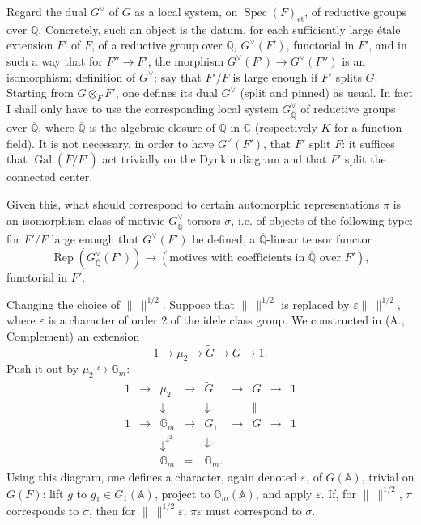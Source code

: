 \documentclass[11pt]{article}
\newcommand{\Gal}{\operatorname{Gal}}
\newcommand{\Spec}{\operatorname{Spec}}
\newcommand{\Rep}{\operatorname{Rep}}
\newcommand{\Fbar}{\overline F}
\newcommand{\normchar}{\|\ \|}
\begin{document}
Regard the dual \(G^\vee\) of \(G\) as a local system, on \(\Spec(F)_{\mathrm{et}}\), of reductive groups over \(\mathbb Q\). Concretely, such an object is the datum, for each sufficiently large étale extension \(F'\) of \(F\), of a reductive group over \(\mathbb Q\), \(G^\vee(F')\), functorial in \(F'\), and in such a way that for \(F''\to F'\), the morphism \(G^\vee(F')\to G^\vee(F'')\) is an isomorphism; definition of \(G^\vee\): say that \(F'/F\) is large enough if \(F'\) splits \(G\). Starting from \(G\otimes_F F'\), one defines its dual \(G^\vee\) (split and pinned) as usual. In fact I shall only have to use the corresponding local system \(G^\vee_{\overline{\mathbb Q}}\) of reductive groups over \(\overline{\mathbb Q}\), where \(\overline{\mathbb Q}\) is the algebraic closure of \(\mathbb Q\) in \(\mathbb C\) (respectively \(K\) for a function field). It is not necessary, in order to have \(G^\vee(F')\), that \(F'\) split \(F\): it suffices that \(\Gal(\Fbar/F')\) act trivially on the Dynkin diagram and that \(F'\) split the connected center.

Given this, what should correspond to certain automorphic representations \(\pi\) is an isomorphism class of motivic \(G^\vee_{\overline{\mathbb Q}}\)-torsors \(\sigma\), i.e. of objects of the following type: for \(F'/F\) large enough that \(G^\vee(F')\) be defined, a \(\overline{\mathbb Q}\)-linear tensor functor
\[
\Rep(G^\vee_{\overline{\mathbb Q}}(F'))\longrightarrow
(\text{motives with coefficients in }\overline{\mathbb Q}\text{ over }F'),
\]
functorial in \(F'\).

Changing the choice of \(\normchar^{1/2}\). Suppose that \(\normchar^{1/2}\) is replaced by \(\varepsilon\normchar^{1/2}\), where \(\varepsilon\) is a character of order \(2\) of the idele class group. We constructed in (A., Complement) an extension
\[
1\longrightarrow\mu_2\longrightarrow\widetilde G\longrightarrow G\longrightarrow1.
\]
Push it out by \(\mu_2\hookrightarrow\mathbb G_m\):
\[
\begin{array}{ccccccccc}
1&\longrightarrow&\mu_2&\longrightarrow&\widetilde G&\longrightarrow&G&\longrightarrow&1\\
&&\downarrow&&\downarrow&&\Vert\\
1&\longrightarrow&\mathbb G_m&\longrightarrow&G_1&\longrightarrow&G&\longrightarrow&1\\
&&\downarrow^{z^2}&&\downarrow\\
&&\mathbb G_m&=&\mathbb G_m.
\end{array}
\]
Using this diagram, one defines a character, again denoted \(\varepsilon\), of \(G(\mathbb A)\), trivial on \(G(F)\): lift \(g\) to \(g_1\in G_1(\mathbb A)\), project to \(\mathbb G_m(\mathbb A)\), and apply \(\varepsilon\). If, for \(\normchar^{1/2}\), \(\pi\) corresponds to \(\sigma\), then for \(\normchar^{1/2}\varepsilon\), \(\pi\varepsilon\) must correspond to \(\sigma\).
\end{document}
